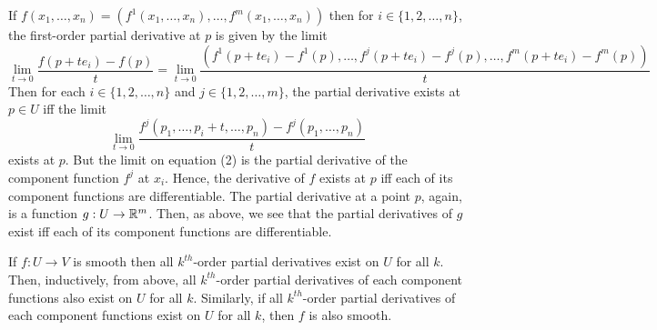 
\begin{solution}
    If $f(x_1,\ldots,x_n)=
    (f^1(x_1,\ldots,x_n),\ldots,f^m(x_1,\ldots,x_n))$
    then for $i\in \{1,2,\ldots,n\}$, the first-order
    partial derivative at $p$ is given by the limit
    \begin{equation}
        \lim_{t\to 0}{\frac{f(p+te_i)-f(p)}{t}}
        =\lim_{t\to 0}{\frac{
            (f^1(p+te_i)-f^1(p),\ldots,f^j(p+te_i)-f^j(p)
            ,\ldots,f^m(p+te_i)-f^m(p))
        }{t}}
    \end{equation}
    Then for each $i\in \{1,2,\ldots,n\}$
    and $j\in \{1,2,\ldots,m\}$,
    the partial derivative exists at
    $p\in U$ iff the
    limit
    \begin{equation}
        \lim_{t\to 0}{\frac{
            f^j(p_1,\ldots,p_i+t,\ldots,p_n)
            -f^j(p_1,\ldots,p_n)
        }{t}}
    \end{equation}
    exists at $p$. But the limit on equation (2)
    is the partial derivative of the component
    function
    $f^j$ at $x_i$. Hence, the derivative of $f$ exists at
    $p$ iff each of its component functions
    are differentiable. The partial derivative at
    a point $p$, again, is a function $g:U\to \mathbb{R}^m$.
    Then, as above, we see that the partial
    derivatives of $g$ exist iff each of its
    component functions are differentiable.

    \vspace*{3mm}
    If $f:U\to V$ is smooth then all $k^{th}$-order
    partial derivatives exist on $U$ for all $k$.
    Then, inductively, from above,
    all $k^{th}$-order
    partial derivatives of each component functions
    also exist on $U$ for all $k$.
    Similarly, if all $k^{th}$-order
    partial derivatives of each component functions
     exist on $U$ for all $k$,
    then $f$ is also smooth.
\end{solution}